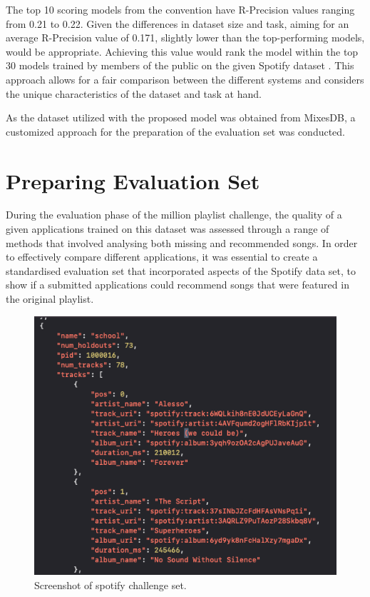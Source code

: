 The top 10 scoring models from the convention have R-Precision values ranging from 0.21 to 0.22. Given the differences in dataset size and task, aiming for an average R-Precision value of 0.171, slightly lower than the top-performing models, would be appropriate. Achieving this value would rank the model within the top 30 models trained by members of the public on the given Spotify dataset \citep{aicrowd_aicrowd_2023}. This approach allows for a fair comparison between the different systems and considers the unique characteristics of the dataset and task at hand. 

As the dataset utilized with the proposed model was obtained from MixesDB, a customized approach for the preparation of the evaluation set was conducted.

\section{Preparing Evaluation Set}
During the evaluation phase of the million playlist challenge, the quality of a given applications trained on this dataset was assessed through a range of methods that involved analysing both missing and recommended songs. In order to effectively compare different applications, it was essential to create a standardised evaluation set that incorporated aspects of the Spotify data set, to show if a submitted applications could recommend songs that were featured in the original playlist.

\begin{figure}[H]
	\includegraphics[scale=0.5]{images/spotify_challenge_set}
	\centering
	\caption{Screenshot of spotify challenge set. \citep{aicrowd_aicrowd_2023}} 
\end{figure}

